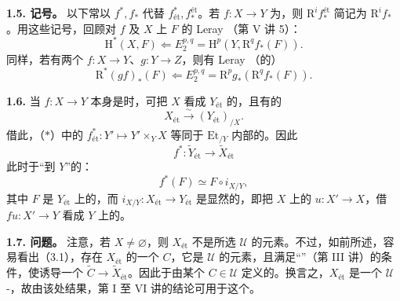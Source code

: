 \textbf{1.5. 记号。} 以下常以 $f^*,f_*$ 代替 $f_{\text{ét}}^*,f_*^{\text{ét}}$。若 $f:X\to Y$ 为，则 $\mathrm R^if_*^{\text{ét}}$ 简记为 $\mathrm R^if_*$。用这些记号，回顾对 $f$ 及 $X$ 上 $F$ 的 Leray （第 V 讲 5）：
\[
 \mathrm H^*(X,F)\Longleftarrow E_2^{p,q}=\mathrm H^p(Y,\mathrm R^qf_*(F)).
\]
同样，若有两个 $f:X\to Y$、$g:Y\to Z$，则有 Leray （的）
\[
 \mathrm R^*(gf)_*(F)\Longleftarrow E_2^{p,q}=\mathrm R^pg_*(\mathrm R^qf_*(F)).
\]

\textbf{1.6.} 当 $f:X\to Y$ 本身是时，可把 $X$ 看成 $Y_{\text{ét}}$ 的，且有的
\[
 X_{\text{ét}}\xrightarrow\sim(Y_{\text{ét}})_{/X}.
\]
借此，（$*$）中的 $f_{\text{ét}}^*:Y'\mapsto Y'\times_YX$ 等同于 $\mathrm{Et}_{/Y}$ 内部的。因此
\[
 f^*:\widetilde Y_{\text{ét}}\longrightarrow\widetilde X_{\text{ét}}
\]
此时于“到 $Y$”的：
\[
 f^*(F)\simeq F\circ i_{X/Y},
\]
其中 $F$ 是 $Y_{\text{ét}}$ 上的，而 $i_{X/Y}:X_{\text{ét}}\to Y_{\text{ét}}$ 是显然的，即把 $X$ 上的 $u:X'\to X$，借 $fu:X'\to Y$ 看成 $Y$ 上的。

\textbf{1.7. 问题。} 注意，若 $X\ne\varnothing$，则 $X_{\text{ét}}$ 不是所选 $\mathcal U$ 的元素。不过，如前所述，容易看出（3.1），存在 $X_{\text{ét}}$ 的一个 $C$，它是 $\mathcal U$ 的元素，且满足“”（第 III 讲）的条件，使诱导一个 $\widetilde C\to\widetilde X_{\text{ét}}$。因此于由某个 $C\in\mathcal U$ 定义的。换言之，$X_{\text{ét}}$ 是一个 $\mathcal U$-，故由该处结果，第 I 至 VI 讲的结论可用于这个。

